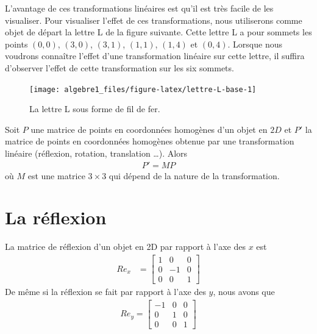 \documentclass[]{book}
\theoremstyle{definition}
\theoremstyle{definition}
\theoremstyle{definition}
\theoremstyle{remark}
\let\BeginKnitrBlock\begin \let\EndKnitrBlock\end
\begin{document}
L'avantage de ces transformations linéaires est qu'il est très facile de les visualiser. Pour visualiser l'effet de ces transformations, nous utiliserons comme objet de départ la lettre L de la figure suivante. Cette lettre L a pour sommets les points \((0,0)\), \((3,0)\), \((3,1)\), \((1,1)\), \((1,4)\) et \((0,4)\). Lorsque nous voudrons connaître l'effet d'une transformation linéaire sur cette lettre, il suffira d'observer l'effet de cette transformation sur les six sommets.

\begin{figure}

{\centering \texttt{[image: algebre1\_files/figure-latex/lettre-L-base-1]} 

}

\caption{La lettre L sous forme de fil de fer.}\label{fig:lettre-L-base}
\end{figure}

\BeginKnitrBlock{proposition}
\protect\hypertarget{prp:unnamed-chunk-252}{}{\label{prp:unnamed-chunk-252} }Soit \(P\) une matrice de points en coordonnées homogènes d'un objet en \(2D\) et \(P'\) la matrice de points en coordonnées homogènes obtenue par une transformation linéaire (réflexion, rotation, translation \ldots{}). Alors
\begin{align*}
P'=MP
\end{align*}
où \(M\) est une matrice \(3\times 3\) qui dépend de la nature de la transformation.
\EndKnitrBlock{proposition}

\hypertarget{la-ruxe9flexion}{%
\section{La réflexion}\label{la-ruxe9flexion}}

\BeginKnitrBlock{definition}
\protect\hypertarget{def:unnamed-chunk-253}{}{\label{def:unnamed-chunk-253} }La matrice de réflexion d'un objet en 2D par rapport à l'axe des \(x\) est
\begin{align*}
Re_x 
&= \begin{bmatrix}
1 & 0 &0\\
0 & -1&0\\
0&0&1
\end{bmatrix}
\end{align*}
De même si la réflexion se fait par rapport à l'axe des \(y\), nous avons que
\begin{align*}
Re_y = \begin{bmatrix}
-1 & 0 &0\\
0 & 1&0\\
0&0&1
\end{bmatrix}
\end{align*}
\EndKnitrBlock{definition}
\end{document}
